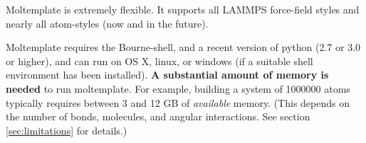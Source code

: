\documentclass[11pt]{article}
\begin{document}
Moltemplate is extremely flexible.  It supports all LAMMPS force-field styles and nearly all atom-styles (now and in the future).



Moltemplate requires the Bourne-shell, and a recent version of python (2.7 or 3.0 or higher), and can run on OS X, linux, or windows (if a suitable shell environment has been installed).  
\textbf{A substantial amount of memory is needed} to run moltemplate.
For example, building a system of 1000000 atoms typically requires 
between 3 and 12 GB of \textit{available} memory.
(This depends on the number of bonds, molecules, and angular interactions.
 See section \ref{sec:limitations} for details.)

\end{document}

